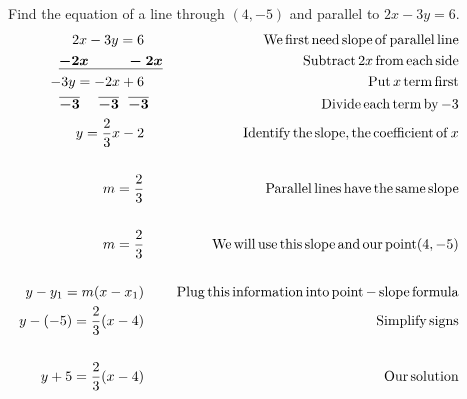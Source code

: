 \begin{example}\label{Lin71}~~~Find the equation of a line through $(4, - 5)$ and parallel to $2 x - 3 y =
  6$.
  \begin{eqnarray*}
    2 x - 3 y = 6~~~~ &  & \operatorname{We} \operatorname{first} \operatorname{need} \operatorname{slope}
    \operatorname{of} \operatorname{parallel} \operatorname{line}\\
    \boldsymbol{\underline{- 2 x ~~~~~~~~- 2 x}} &  & \operatorname{Subtract} 2 x \operatorname{from} \operatorname{each}
    \operatorname{side}\\
    - 3 y = - 2 x + 6~~~~ &  & \operatorname{Put} x \operatorname{term} \operatorname{first}\\
    \boldsymbol{\overline{- 3} ~~~~ \overline{- 3} ~~ \overline{- 3}}~~~ &  & \operatorname{Divide}
    \operatorname{each} \operatorname{term} \operatorname{by} - 3\\
    y = \frac{2}{3} x - 2~~~~ &  & \operatorname{Identify} \operatorname{the} \operatorname{slope},
    \operatorname{the} \operatorname{coefficient} \operatorname{of} x\\
    &  & \\
    m = \frac{2}{3}~~~~ &  & \operatorname{Parallel} \operatorname{lines} \operatorname{have} \operatorname{the}
    \operatorname{same} \operatorname{slope}\\
    &  & \\
    m = \frac{2}{3}~~~~ &  & \operatorname{We} \operatorname{will} \operatorname{use} \operatorname{this}
    \operatorname{slope} \operatorname{and} \operatorname{our} \operatorname{point} (4, - 5)\\
    &  & \\
    y - y_1 = m (x - x_1)~~~~ &  & \operatorname{Plug} \operatorname{this} \operatorname{information}
    \operatorname{into} \operatorname{point}-\operatorname{slope} \operatorname{formula}\\
    y - (- 5) = \frac{2}{3} (x - 4)~~~~ &  & \operatorname{Simplify} \operatorname{signs}\\
    &  & \\
    y + 5 = \frac{2}{3} (x - 4)~~~~ &  & \operatorname{Our} \operatorname{solution}
  \end{eqnarray*}
\end{example}

